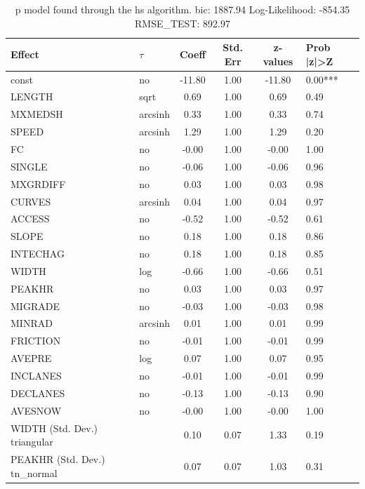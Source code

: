 \begin{table}
	\caption{p model found through the hs algorithm. bic: 1887.94 Log-Likelihood: -854.35 RMSE_TEST: 892.97}
	\begin{center}
		\begin{tabular}{|l|l|c|c|c|l|}
			\hline
			Effect & $\tau$ & Coeff & Std. Err & z-values & Prob |z|>Z \\
			\hline
			const & no & -11.80 & 1.00 & -11.80 & 0.00*** \\
			\hline
			LENGTH & sqrt & 0.69 & 1.00 & 0.69 & 0.49 \\
			\hline
			MXMEDSH & arcsinh & 0.33 & 1.00 & 0.33 & 0.74 \\
			\hline
			SPEED & arcsinh & 1.29 & 1.00 & 1.29 & 0.20 \\
			\hline
			FC & no & -0.00 & 1.00 & -0.00 & 1.00 \\
			\hline
			SINGLE & no & -0.06 & 1.00 & -0.06 & 0.96 \\
			\hline
			MXGRDIFF & no & 0.03 & 1.00 & 0.03 & 0.98 \\
			\hline
			CURVES & arcsinh & 0.04 & 1.00 & 0.04 & 0.97 \\
			\hline
			ACCESS & no & -0.52 & 1.00 & -0.52 & 0.61 \\
			\hline
			SLOPE & no & 0.18 & 1.00 & 0.18 & 0.86 \\
			\hline
			INTECHAG & no & 0.18 & 1.00 & 0.18 & 0.85 \\
			\hline
			WIDTH & log & -0.66 & 1.00 & -0.66 & 0.51 \\
			\hline
			PEAKHR & no & 0.03 & 1.00 & 0.03 & 0.97 \\
			\hline
			MIGRADE & no & -0.03 & 1.00 & -0.03 & 0.98 \\
			\hline
			MINRAD & arcsinh & 0.01 & 1.00 & 0.01 & 0.99 \\
			\hline
			FRICTION & no & -0.01 & 1.00 & -0.01 & 0.99 \\
			\hline
			AVEPRE & log & 0.07 & 1.00 & 0.07 & 0.95 \\
			\hline
			INCLANES & no & -0.01 & 1.00 & -0.01 & 0.99 \\
			\hline
			DECLANES & no & -0.13 & 1.00 & -0.13 & 0.90 \\
			\hline
			AVESNOW & no & -0.00 & 1.00 & -0.00 & 1.00 \\
			\hline
			WIDTH (Std. Dev.) triangular &  & 0.10 & 0.07 & 1.33 & 0.19 \\
			\hline
			PEAKHR (Std. Dev.) tn_normal &  & 0.07 & 0.07 & 1.03 & 0.31 \\

\end{tabular}
\end{center}
\end{table}
